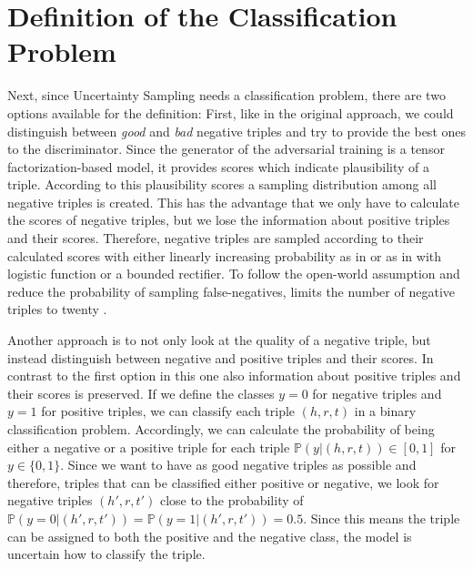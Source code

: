 \section{Definition of the Classification Problem}
\label{sec:definition_of_the_classification_problem}
Next, since Uncertainty Sampling needs a classification problem, there are two options available for the definition:
First, like in the original \kbgan approach, we could distinguish between \textit{good} and \textit{bad} negative triples and try to provide the best ones to the discriminator.
Since the generator of the adversarial training is a tensor factorization-based model, it provides scores which indicate plausibility of a triple.
According to this plausibility scores a sampling distribution among all negative triples is created. 
This has the advantage that we only have to calculate the scores of negative triples, but we lose the information about positive triples and their scores.
Therefore, negative triples are sampled according to their calculated scores with either linearly increasing probability as in \cite{cai2017kbgan} or as in \cite{UKGE} with logistic function or a bounded rectifier.
To follow the open-world assumption and reduce the probability of sampling false-negatives,
\kbgan limits the number of negative triples to twenty \cite{cai2017kbgan}.

Another approach is to not only look at the quality of a negative triple, but instead distinguish between negative and positive triples and their scores.
In contrast to the first option in this one also information about positive triples and their scores is preserved.
If we define the classes $y = 0$  for negative triples and $y = 1$ for positive triples, we can classify each triple $(h,r,t)$ in a binary classification problem.
Accordingly, we can calculate the probability of being either a negative or a positive triple for each triple $\mathbb{P}(y| (h,r,t)) \in [0,1]$ for $y \in \{0,1\}$.
Since we want to have as good negative triples as possible and therefore, triples that can be classified either positive or negative, we look for negative triples $(h',r,t')$ close to the probability of $\mathbb{P}(y = 0| (h',r,t')) = \mathbb{P}(y = 1| (h',r,t')) = 0.5$.
Since this means the triple can be assigned to both the positive and the negative class, 
the model is uncertain how to classify the triple.

